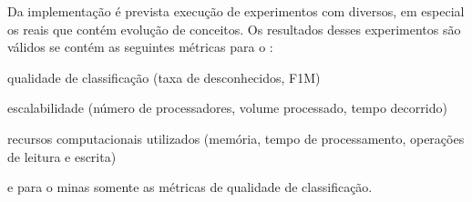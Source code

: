 Da implementação \mfog é prevista execução de experimentos com \datasets
diversos, em especial os \datasets reais que contém evolução de conceitos.
Os resultados desses experimentos são válidos se contém as seguintes métricas
para o \mfog: \begin{enumerate*}[label={\alph*)}]
  \item qualidade de classificação (taxa de desconhecidos, F1M)
  \item escalabilidade (número de processadores, volume processado, tempo decorrido)
  \item recursos computacionais utilizados (memória, tempo de processamento, operações de leitura e escrita)
\end{enumerate*}
e para o minas somente as métricas de qualidade de classificação.





